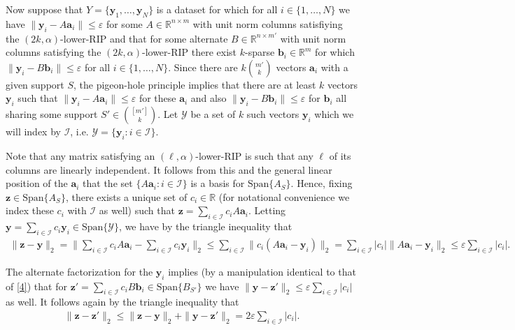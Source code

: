 \documentclass[journal,onecolumn]{IEEEtran}
\begin{document}
Now suppose that $Y = \{\mathbf{y}_1, \ldots, \mathbf{y}_N\}$ is a dataset for which for all $i \in \{1, \ldots, N\}$ we have $\|\mathbf{y}_i - A\mathbf{a}_i\| \leq \varepsilon$ for some $A \in \mathbb{R}^{n \times m}$ with unit norm columns satisfiying the $(2k,\alpha)$-lower-RIP and that for some alternate $B \in \mathbb{R}^{n \times m'}$ with unit norm columns satisfying the $(2k,\alpha)$-lower-RIP there exist $k$-sparse $\mathbf{b}_i \in \mathbb{R}^m$ for which $\|\mathbf{y}_i - B\mathbf{b}_i\| \leq \varepsilon$ for all $i \in \{1, \ldots, N\}$. Since there are $k{m' \choose k}$ vectors $\mathbf{a}_i$ with a given support $S$, the pigeon-hole principle implies that there are at least $k$ vectors $\mathbf{y}_i$ such that $\|\mathbf{y}_i - A\mathbf{a}_i\| \leq \varepsilon$ for these $\mathbf{a}_i$ and also $\|\mathbf{y}_i - B\mathbf{b}_i\| \leq \varepsilon$ for $\mathbf{b}_i$ all sharing some support $S' \in {[m'] \choose k}$. Let $\mathcal{Y}$ be a set of $k$ such vectors $\mathbf{y}_i$ which we will index by $\mathcal{I}$, i.e. $\mathcal{Y} = \{\mathbf{y}_i: i \in \mathcal{I}\}$.

Note that any matrix satisfying an $(\ell,\alpha)$-lower-RIP is such that any $\ell$ of its columns are linearly independent. It follows from this and the general linear position of the $\mathbf{a}_i$ that the set $\{A\mathbf{a}_i: i \in \mathcal{I}\}$ is a basis for $\text{Span}\{A_S\}$. Hence, fixing $\mathbf{z} \in \text{Span}\{A_S\}$, there exists a unique set of $c_i \in \mathbb{R}$ (for notational convenience we index these $c_i$ with $\mathcal{I}$ as well) such that $\mathbf{z} = \sum_{i \in \mathcal{I}} c_iA\mathbf{a}_i$. Letting $\mathbf{y} = \sum_{i \in \mathcal{I}} c_i\mathbf{y}_i  \in \text{Span}\{\mathcal{Y}\}$, we have by the triangle inequality that
\begin{align}\label{4}
\|\mathbf{z} - \mathbf{y}\|_2 = \| \sum_{i \in \mathcal{I}} c_i A \mathbf{a}_i -  \sum_{i \in \mathcal{I}} c_i \mathbf{y}_i \|_2 \leq \sum_{i \in \mathcal{I}} \| c_i (A\mathbf{a}_i - \mathbf{y}_i) \|_2 = \sum_{i \in \mathcal{I}} |c_i| \| A\mathbf{a}_i - \mathbf{y}_i \|_2 \leq \varepsilon \sum_{i \in \mathcal{I}} |c_i|.
\end{align}

The alternate factorization for the $\mathbf{y}_i$ implies (by a manipulation identical to that of \eqref{4}) that for $\mathbf{z}' = \sum_{i \in \mathcal{I}} c_i B\mathbf{b}_i \in \text{Span}\{B_{S'}\}$ we have $\|\mathbf{y} - \mathbf{z}'\|_2 \leq \varepsilon \sum_{i \in \mathcal{I}} |c_i|$ as well. It follows again by the triangle inequality that
\begin{align}\label{dist}
\|\mathbf{z} - \mathbf{z}'\|_2 \leq \|\mathbf{z} - \mathbf{y}\|_2 + \|\mathbf{y} - \mathbf{z}'\|_2 = 2 \varepsilon \sum_{i \in \mathcal{I}} |c_i|.
\end{align}
\end{document}
